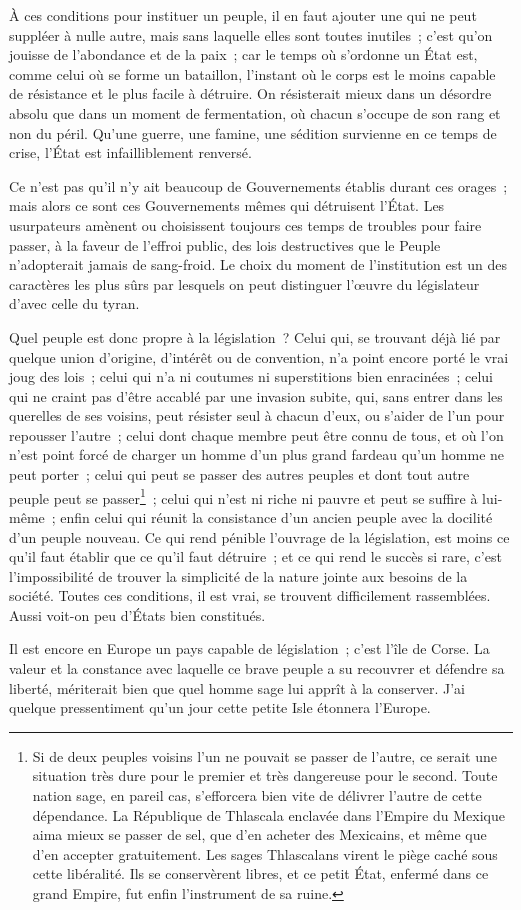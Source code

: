 \documentclass[french,twoside]{book} %
\begin{document}
À ces conditions pour instituer un peuple, il en faut ajouter une qui ne peut suppléer à nulle autre, mais sans laquelle elles sont toutes inutiles ; c’est qu’on jouisse de l’abondance et de la paix ; car le temps où s’ordonne un État est, comme celui où se forme un bataillon, l’instant où le corps est le moins capable de résistance et le plus facile à détruire. On résisterait mieux dans un désordre absolu que dans un moment de fermentation, où chacun s’occupe de son rang et non du péril. Qu’une guerre, une famine, une sédition survienne en ce temps de crise, l’État est infailliblement renversé.\par
Ce n’est pas qu’il n’y ait beaucoup de Gouvernements établis durant ces orages ; mais alors ce sont ces Gouvernements mêmes qui détruisent l’État. Les usurpateurs amènent ou choisissent toujours ces temps de troubles pour faire passer, à la faveur de l’effroi public, des lois destructives que le Peuple n’adopterait jamais de sang-froid. Le choix du moment de l’institution est un des caractères les plus sûrs par lesquels on peut distinguer l’œuvre du législateur d’avec celle du tyran.\par
Quel peuple est donc propre à la législation ? Celui qui, se trouvant déjà lié par quelque union d’origine, d’intérêt ou de convention, n’a point encore porté le vrai joug des lois ; celui qui n’a ni coutumes ni superstitions bien enracinées ; celui qui ne craint pas d’être accablé par une invasion subite, qui, sans entrer dans les querelles de ses voisins, peut résister seul à chacun d’eux, ou s’aider de l’un pour repousser l’autre ; celui dont chaque membre peut être connu de tous, et où l’on n’est point forcé de charger un homme d’un plus grand fardeau qu’un homme ne peut porter ; celui qui peut se passer des autres peuples et dont tout autre peuple peut se passer\footnote{Si de deux peuples voisins l’un ne pouvait se passer de l’autre, ce serait une situation très dure pour le premier et très dangereuse pour le second. Toute nation sage, en pareil cas, s’efforcera bien vite de délivrer l’autre de cette dépendance. La République de Thlascala enclavée dans l’Empire du Mexique aima mieux se passer de sel, que d’en acheter des Mexicains, et même que d’en accepter gratuitement. Les sages Thlascalans virent le piège caché sous cette libéralité. Ils se conservèrent libres, et ce petit État, enfermé dans ce grand Empire, fut enfin l’instrument de sa ruine.} ; celui qui n’est ni riche ni pauvre et peut se suffire à lui-même ; enfin celui qui réunit la consistance d’un ancien peuple avec la docilité d’un peuple nouveau. Ce qui rend pénible l’ouvrage de la législation, est moins ce qu’il faut établir que ce qu’il faut détruire ; et ce qui rend le succès si rare, c’est l’impossibilité de trouver la simplicité de la nature jointe aux besoins de la société. Toutes ces conditions, il est vrai, se trouvent difficilement rassemblées. Aussi voit-on peu d’États bien constitués.\par
Il est encore en Europe un pays capable de législation ; c’est l’île de Corse. La valeur et la constance avec laquelle ce brave peuple a su recouvrer et défendre sa liberté, mériterait bien que quel homme sage lui apprît à la conserver. J’ai quelque pressentiment qu’un jour cette petite Isle étonnera l’Europe.
\end{document}
